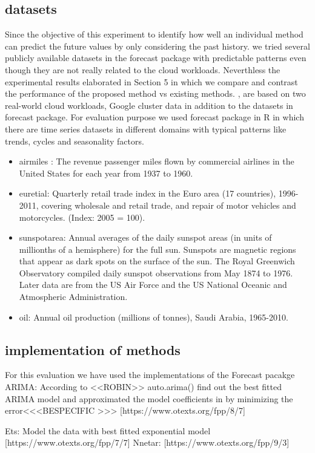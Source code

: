 \subsection{datasets}
Since the objective of this experiment to identify how well an individual method can predict the future values by only considering the past history. we tried several publicly available datasets in the forecast package with predictable patterns even though they are not really related to the cloud workloads. Neverthless the experimental results elaborated in Section 5 in which we  compare and contrast the performance of the proposed method vs existing methods. , are based on two real-world cloud workloads, Google cluster data  in addition to the datasets in forecast package. For evaluation purpose we used forecast package in R \cite{forecastPackage} in which there are time series datasets in different domains with typical patterns like trends, cycles and seasonality factors. 


\begin{itemize}
\item airmiles : The revenue passenger miles flown by commercial airlines in the United States for each year from 1937 to 1960.
\item euretial: Quarterly retail trade index in the Euro area (17 countries), 1996-2011, covering wholesale and retail trade, and repair of motor vehicles and motorcycles. (Index: 2005 = 100).
\item sunspotarea: Annual averages of the daily sunspot areas (in units of millionths of a hemisphere) for the full sun. Sunspots are magnetic regions that appear as dark spots on the surface of the sun. The Royal Greenwich Observatory compiled daily sunspot observations from May 1874 to 1976. Later data are from the US Air Force and the US National Oceanic and Atmospheric Administration.
\item oil: Annual oil production (millions of tonnes), Saudi Arabia, 1965-2010.
\end{itemize}





\subsection{implementation of methods}
For this evaluation we have used the implementations of the Forecast pacakge \cite{forecastPackage}
ARIMA: According to <<ROBIN>> auto.arima()  find out the best fitted ARIMA model and approximated the model coefficients in by minimizing the error<<<BESPECIFIC >>> [https://www.otexts.org/fpp/8/7]

Ets: Model the data with best fitted exponential model [https://www.otexts.org/fpp/7/7]
    \cite{Wagner_2011}
	Nnetar: [https://www.otexts.org/fpp/9/3]
